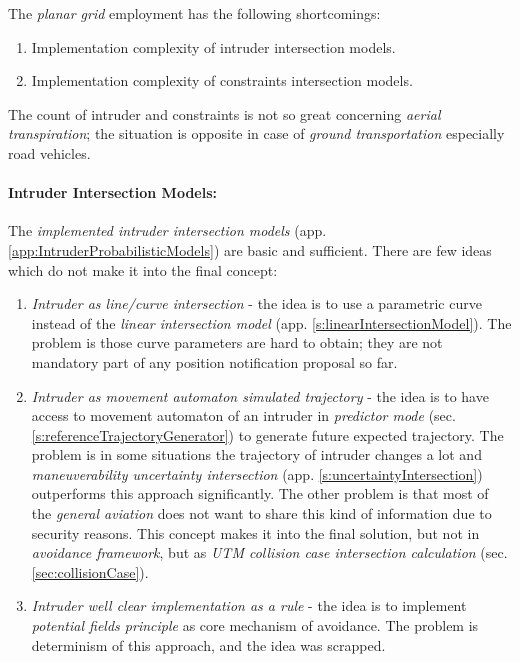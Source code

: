 \noindent The \emph{planar grid} employment has the following shortcomings:
\begin{enumerate}
    \item Implementation complexity of intruder intersection models.
    \item Implementation complexity of constraints intersection models.
\end{enumerate}

\begin{note}
    The count of intruder and constraints is not so great concerning \emph{aerial transpiration}; the situation is opposite in case of \emph{ground transportation} especially road vehicles. 
\end{note}

\paragraph{Intruder Intersection Models:} The \emph{implemented intruder intersection models} (app. \ref{app:IntruderProbabilisticModels}) are basic and sufficient. There are few ideas which do not make it into the final concept:

\begin{enumerate}
    \item \emph{Intruder as line/curve intersection} - the idea is to use a parametric curve instead of the \emph{linear intersection model} (app. \ref{s:linearIntersectionModel}). The problem is those curve parameters are hard to obtain; they are not mandatory part of any position notification proposal so far.
	
	\item \emph{Intruder as movement automaton simulated trajectory} - the idea is to have access to movement automaton of an intruder in \emph{predictor mode} (sec. \ref{s:referenceTrajectoryGenerator}) to generate future expected trajectory. The problem is in some situations the trajectory of intruder changes a lot and \emph{maneuverability uncertainty intersection} (app. \ref{s:uncertaintyIntersection}) outperforms this approach significantly. The other problem is that most of the \emph{general aviation} does not want to share this kind of information due to security reasons.  This concept makes it into the final solution, but not in \emph{avoidance framework}, but as \emph{UTM collision case intersection calculation} (sec. \ref{sec:collisionCase}).
	
	\item \emph{Intruder well clear implementation as a rule} - the idea is to implement \emph{potential fields principle} as core mechanism of avoidance. The problem is determinism of this approach, and the idea was scrapped.
\end{enumerate}

